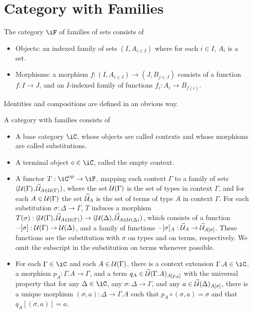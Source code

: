 \documentclass{amsart}
\begin{document}
\section{Category with Families}
\label{sec:category-with-families}

\begin{defn}
  The category $\iF$ of families of sets consists of
  \begin{itemize}
  \item Objects: an indexed family of sets $(I, A_{i \in I})$ where for each $i \in I$, $A_{i}$ is a set.
  \item Morphisms: a morphism $f : (I, A_{i \in I}) \to (J, B_{j \in J})$ consists of a function $f : I \to J$, and an $I$-indexed family of functions $f_{i} : A_{i} \to B_{f(i)}$.
  \end{itemize}
  Identities and compositions are defined in an obvious way.
\end{defn}

\begin{defn}
  A category with families consists of
  \begin{itemize}
  \item A base category $\iC$, whose objects are called contexts and whose morphisms are called substitutions.
  \item A terminal object $\diamond \in \iC$, called the empty context.
  \item A functor $T : \iC\op \to \iF$, mapping each context $\Gamma$ to a family of sets $(\mathcal{U}(\Gamma), \widetilde{\mathcal{U}}_{A \in \mathcal{U}(\Gamma)})$, where the set $\mathcal{U}(\Gamma)$ is the set of types in context $\Gamma$, and for each $A \in \mathcal{U}(\Gamma)$ the set $\widetilde{\mathcal{U}}_{A}$ is the set of terms of type $A$ in context $\Gamma$.
    For each substitution $\sigma : \Delta \to \Gamma$, $T$ induces a morphism $T(\sigma) : (\mathcal{U}(\Gamma), \widetilde{\mathcal{U}}_{A \in \mathcal{U}(\Gamma)}) \to (\mathcal{U}(\Delta), \widetilde{\mathcal{U}}_{A \in \mathcal{U}(\Delta)})$, which consists of a function $\mathord{\hspace{1pt}\text{--}\hspace{1pt}}[\sigma] : \mathcal{U}(\Gamma) \to \mathcal{U}(\Delta)$, and a family of functions $\mathord{\hspace{1pt}\text{--}\hspace{1pt}}[\sigma]_{A} : \widetilde{\mathcal{U}}_{A} \to \widetilde{\mathcal{U}}_{A[\sigma]}$.
    These functions are the substitution with $\sigma$ on types and on terms, respectively.
    We omit the subscript in the substitution on terms whenever possible.
  \item For each $\Gamma \in \iC$ and each $A \in \mathcal{U}(\Gamma)$, there is a context extension $\Gamma.A \in \iC$, a morphism $p_{A} : \Gamma.A \to \Gamma$, and a term $q_{A} \in \widetilde{\mathcal{U}}(\Gamma.A)_{A[p_{A}]}$ with the universal property that for any $\Delta \in \iC$, any $\sigma : \Delta \to \Gamma$, and any $a \in \widetilde{\mathcal{U}}(\Delta)_{A[\sigma]}$, there is a unique morphism $(\sigma, a) : \Delta \to \Gamma.A$ such that $p_{A} \circ (\sigma, a) = \sigma$ and that $q_{A}[(\sigma, a)] = a$.
    
  \end{itemize}
\end{defn}
\end{document}
